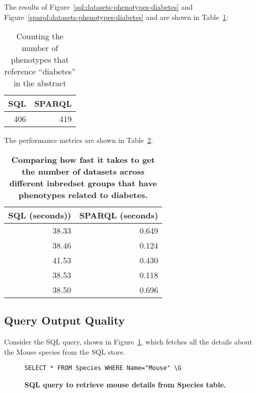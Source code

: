 The results of Figure~\ref{sql:datasets-phenotypes-diabetes} and Figure~\ref{sparql:datasets-phenotypes-diabetes} and are shown in Table~\ref{table:datasets-phenotypes-diabetes}:

\begin{table}[H]
\begin{tabular}{rr}
SQL & SPARQL \\[0pt]
\toprule
406 & 419\\[0pt]
\end{tabular}
\caption{Counting the number of phenotypes that reference ``diabetes'' in the abstract}\label{table:datasets-phenotypes-diabetes}
\end{table}

The performance metrics are shown in Table~\ref{table:perf-3}.

\begin{table}[H]
\begin{tabular}{rr}
SQL (seconds)) & SPARQL (seconds)\\[0pt]
\toprule
38.33 & 0.649\\[0pt]
38.46 & 0.124\\[0pt]
41.53 & 0.430\\[0pt]
38.53 & 0.118\\[0pt]
38.50 & 0.696\\[0pt]
\end{tabular}
\caption[Performance comparison in seconds: Counting diabetes-related phenotype datasets across different inbredset group]{\textbf{Comparing how fast it takes to get the number of datasets across different inbredset groups that have phenotypes related to diabetes.}}\label{table:perf-3}
\end{table}

\subsection{Query Output Quality}

Consider the SQL query, shown in Figure~\ref{sql:mouse}, which fetches all the details about the Mouse species from the SQL store.

\begin{figure}[H]
\centering
\begin{verbatim}
SELECT * FROM Species WHERE Name="Mouse" \G
\end{verbatim}
\caption[SQL: Fetching mouse details from Species table]{\textbf{SQL query to retrieve mouse details from Species table.}}\label{sql:mouse}
\end{figure}

